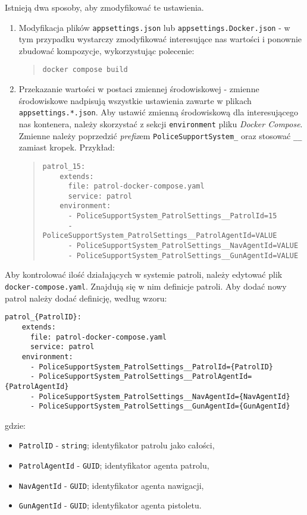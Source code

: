 \par Istnieją dwa sposoby, aby zmodyfikować te ustawienia.
\begin{enumerate}
    \item Modyfikacja plików \texttt{appsettings.json} lub \texttt{appsettings.Docker.json} - w tym przypadku wystarczy zmodyfikować interesujące nas wartości i ponownie zbudować kompozycje, wykorzystując polecenie:
    \begin{quote}
        \begin{verbatim}
docker compose build
        \end{verbatim}
    \end{quote}
    \item Przekazanie wartości w postaci zmiennej środowiskowej - zmienne środowiskowe nadpisują wszystkie ustawienia zawarte w plikach \texttt{appsettings.*.json}. Aby ustawić zmienną środowiskową dla interesującego nas kontenera, należy skorzystać z sekcji \texttt{environment} pliku \emph{Docker Compose}. Zmienne należy poprzedzić \emph{prefix}em \texttt{PoliceSupportSystem\_} oraz stosować \texttt{\_\_} zamiast kropek. Przykład:
    \begin{quote}
        \begin{verbatim}
patrol_15:
    extends:
      file: patrol-docker-compose.yaml
      service: patrol
    environment:
      - PoliceSupportSystem_PatrolSettings__PatrolId=15
      - PoliceSupportSystem_PatrolSettings__PatrolAgentId=VALUE
      - PoliceSupportSystem_PatrolSettings__NavAgentId=VALUE
      - PoliceSupportSystem_PatrolSettings__GunAgentId=VALUE
        \end{verbatim}
    \end{quote}
\end{enumerate}

\par Aby kontrolować ilość działających w systemie patroli, należy edytować plik \texttt{docker-compose.yaml}. Znajdują się w nim definicje patroli. Aby dodać nowy patrol należy dodać definicję, według wzoru:
\begin{verbatim}
patrol_{PatrolID}:
    extends:
      file: patrol-docker-compose.yaml
      service: patrol
    environment:
      - PoliceSupportSystem_PatrolSettings__PatrolId={PatrolID}
      - PoliceSupportSystem_PatrolSettings__PatrolAgentId={PatrolAgentId}
      - PoliceSupportSystem_PatrolSettings__NavAgentId={NavAgentId}
      - PoliceSupportSystem_PatrolSettings__GunAgentId={GunAgentId}
\end{verbatim}
gdzie:
\begin{itemize}
    \item \texttt{PatrolID} - \texttt{string}; identyfikator patrolu jako całości,
    \item \texttt{PatrolAgentId} - \texttt{GUID}; identyfikator agenta patrolu,
    \item \texttt{NavAgentId} - \texttt{GUID}; identyfikator agenta nawigacji,
    \item \texttt{GunAgentId} - \texttt{GUID}; identyfikator agenta pistoletu.
\end{itemize}

